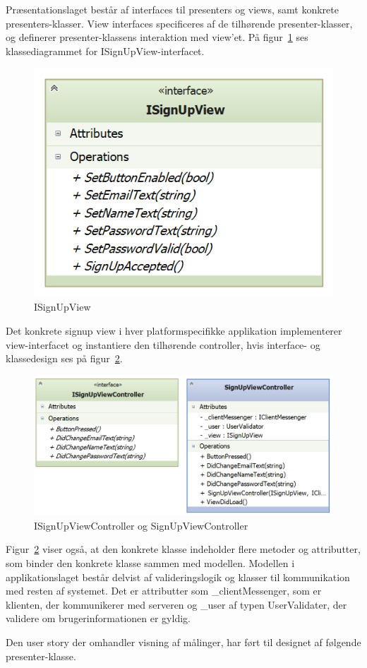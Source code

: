 Præsentationslaget består af interfaces til presenters og views, samt konkrete presenters-klasser. View interfaces specificeres af de tilhørende presenter-klasser, og definerer presenter-klassens interaktion med view'et. På figur~\ref{fig:application_isignupview} ses klassediagrammet for ISignUpView-interfacet.

\begin{figure}
\centering
\includegraphics[width=0.35\linewidth]{figs/design/application_isignupview}
\caption{ISignUpView}
\label{fig:application_isignupview}
\end{figure}

Det konkrete signup view i hver platformspecifikke applikation implementerer view-interfacet og instantiere den tilhørende controller, hvis interface- og klassedesign ses på figur~\ref{fig:application_isignupviewcontroller}.

\begin{figure}
\centering
\includegraphics[width=0.7\linewidth]{figs/design/application_signupviewcontrollerandinterface}
\caption{ISignUpViewController og SignUpViewController}
\label{fig:application_isignupviewcontroller}
\end{figure}
Figur~\ref{fig:application_isignupviewcontroller} viser også, at den konkrete klasse indeholder flere metoder og attributter, som binder den konkrete klasse sammen med modellen. Modellen i applikationslaget består delvist af valideringslogik og klasser til kommunikation med resten af systemet. Det er attributter som \_clientMessenger, som er klienten, der kommunikerer med serveren og \_user af typen UserValidater, der validere om brugerinformationen er gyldig.

Den user story der omhandler visning af målinger, har ført til designet af følgende presenter-klasse.

